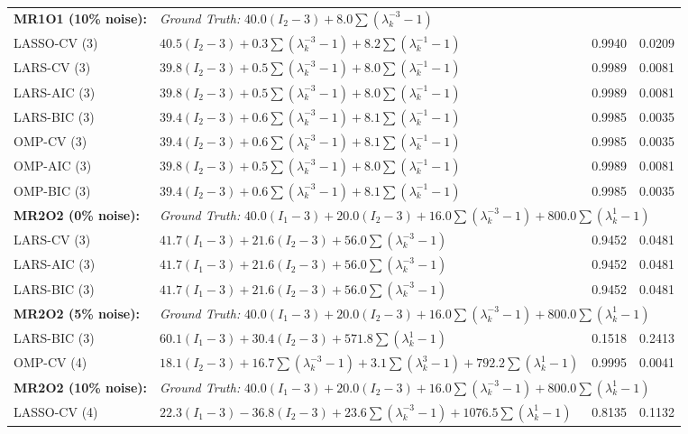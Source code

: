 \documentclass[11pt,a4paper]{article}
\begin{document}
{\begin{longtable}{@{}l l cc@{}}
\textbf{MR1O1 (10\% noise):} & \multicolumn{3}{l}{\textit{Ground Truth: } $40.0 (I_2 - 3) + 8.0 \sum (\lambda_k^{-3} - 1)$} \\
LASSO-CV (3) & $40.5 (I_2 - 3) + 0.3 \sum (\lambda_k^{-3} - 1) + 8.2 \sum (\lambda_k^{-1} - 1)$ & 0.9940 & 0.0209 \\
LARS-CV (3) & $39.8 (I_2 - 3) + 0.5 \sum (\lambda_k^{-3} - 1) + 8.0 \sum (\lambda_k^{-1} - 1)$ & 0.9989 & 0.0081 \\
LARS-AIC (3) & $39.8 (I_2 - 3) + 0.5 \sum (\lambda_k^{-3} - 1) + 8.0 \sum (\lambda_k^{-1} - 1)$ & 0.9989 & 0.0081 \\
LARS-BIC (3) & $39.4 (I_2 - 3) + 0.6 \sum (\lambda_k^{-3} - 1) + 8.1 \sum (\lambda_k^{-1} - 1)$ & 0.9985 & 0.0035 \\
OMP-CV (3) & $39.4 (I_2 - 3) + 0.6 \sum (\lambda_k^{-3} - 1) + 8.1 \sum (\lambda_k^{-1} - 1)$ & 0.9985 & 0.0035 \\
OMP-AIC (3) & $39.8 (I_2 - 3) + 0.5 \sum (\lambda_k^{-3} - 1) + 8.0 \sum (\lambda_k^{-1} - 1)$ & 0.9989 & 0.0081 \\
OMP-BIC (3) & $39.4 (I_2 - 3) + 0.6 \sum (\lambda_k^{-3} - 1) + 8.1 \sum (\lambda_k^{-1} - 1)$ & 0.9985 & 0.0035 \\
\midrule

\textbf{MR2O2 (0\% noise):} & \multicolumn{3}{l}{\textit{Ground Truth: } $40.0 (I_1 - 3) + 20.0 (I_2 - 3) + 16.0 \sum (\lambda_k^{-3} - 1) + 800.0 \sum (\lambda_k^{1} - 1)$} \\
LARS-CV (3) & $41.7 (I_1 - 3) + 21.6 (I_2 - 3) + 56.0 \sum (\lambda_k^{-3} - 1)$ & 0.9452 & 0.0481 \\
LARS-AIC (3) & $41.7 (I_1 - 3) + 21.6 (I_2 - 3) + 56.0 \sum (\lambda_k^{-3} - 1)$ & 0.9452 & 0.0481 \\
LARS-BIC (3) & $41.7 (I_1 - 3) + 21.6 (I_2 - 3) + 56.0 \sum (\lambda_k^{-3} - 1)$ & 0.9452 & 0.0481 \\
\midrule

\textbf{MR2O2 (5\% noise):} & \multicolumn{3}{l}{\textit{Ground Truth: } $40.0 (I_1 - 3) + 20.0 (I_2 - 3) + 16.0 \sum (\lambda_k^{-3} - 1) + 800.0 \sum (\lambda_k^{1} - 1)$} \\
LARS-BIC (3) & $60.1 (I_1 - 3) + 30.4 (I_2 - 3) + 571.8 \sum (\lambda_k^{1} - 1)$ & 0.1518 & 0.2413 \\
OMP-CV (4) & $18.1 (I_2 - 3) + 16.7 \sum (\lambda_k^{-3} - 1) + 3.1 \sum (\lambda_k^{3} - 1) + 792.2 \sum (\lambda_k^{1} - 1)$ & 0.9995 & 0.0041 \\
\midrule

\textbf{MR2O2 (10\% noise):} & \multicolumn{3}{l}{\textit{Ground Truth: } $40.0 (I_1 - 3) + 20.0 (I_2 - 3) + 16.0 \sum (\lambda_k^{-3} - 1) + 800.0 \sum (\lambda_k^{1} - 1)$} \\
LASSO-CV (4) & $22.3 (I_1 - 3) - 36.8 (I_2 - 3) + 23.6 \sum (\lambda_k^{-3} - 1) + 1076.5 \sum (\lambda_k^{1} - 1)$ & 0.8135 & 0.1132 \\
\end{longtable}
}
\end{document}
